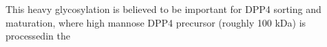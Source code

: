 This heavy glycosylation is believed to be important for DPP4 sorting and maturation, where high mannose DPP4 precursor (roughly 100 kDa) is processedin the  \cite{Matter_1991}